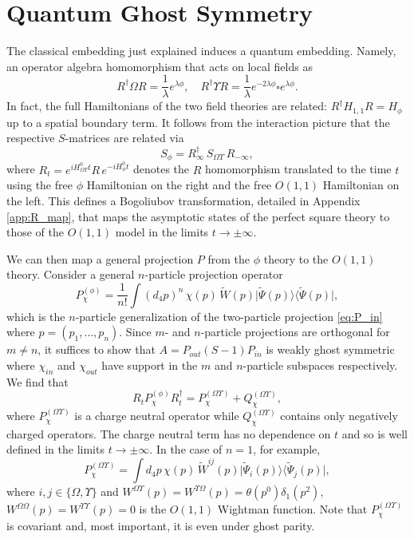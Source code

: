 \documentclass[pra,aps,amsmath,amssymb,notitlepage, twocolumn,superscriptaddress,longbibliography,nofootinbib,floatfix,10pt]{revtex4-2}
\begin{document}
\section{Quantum Ghost Symmetry}

 
The classical embedding just explained induces a quantum embedding. Namely, an operator algebra homomorphism that acts on local fields as
\begin{equation}
    R^\dagger\Omega R = \frac1{\lambda} e^{\lambda\phi}, \quad R^\dagger\Upsilon R = \frac1{\lambda} e^{-2\lambda\phi}\square e^{\lambda\phi}.
\end{equation}
In fact, the full Hamiltonians of the two field theories are related: $R^\dagger H_{1,1} R = H_\phi$ up to a spatial boundary term. It follows from the interaction picture that the respective $S$-matrices are related via
\begin{equation}
\label{eq:isom}
    S_\phi=R_\infty^\dagger\, S_{\Omega\Upsilon} \,R_{-\infty},
\end{equation}
where $R_t=e^{iH^0_{\Omega\Upsilon} t}R\,e^{-iH^0_{\phi} t}$ denotes the $R$ homomorphism translated to the time $t$ using the free $\phi$ Hamiltonian on the right and the free $O(1,1)$ Hamiltonian on the left. This defines a Bogoliubov transformation, detailed in Appendix \ref{app:R_map}, that maps the asymptotic states of the perfect square theory to those of the $O(1,1)$ model in the limits $t\to\pm\infty$.

We can then map a general projection $P$ from the $\phi$ theory to the $O(1,1)$ theory. Consider a general $n$-particle projection operator
\begin{equation}
    P_\chi^{(\phi)} = \frac1{n!} \int (d_4p)^n\,\chi(p)\,\tilde{W}(p) \bigl| \tilde{\Psi}(p)\bigr\rangle \bigl\langle \tilde{\Psi}(p)\bigr|,
\end{equation}
which is the $n$-particle generalization of the two-particle projection \eqref{eq:P_in} where $p=(p_1,\dots,p_n)$. Since $m$- and $n$-particle projections are orthogonal for $m\ne n$, it suffices to show that $A=P_{out}(S\!-\!1)P_{in}$ is weakly ghost symmetric where $\chi_{in}$ and $\chi_{out}$ have support in the $m$ and $n$-particle subspaces respectively. We find that~\cite{BTlong} 
\begin{equation}\label{eq:P_f_decomposition}
	R_tP_\chi^{(\phi)}R_t^\dagger = P_\chi^{(\Omega\Upsilon)} + Q_{\chi}^{(\Omega\Upsilon)},
\end{equation}
where $P_\chi^{(\Omega\Upsilon)}$ is a charge neutral operator while $Q_{\chi}^{(\Omega\Upsilon)}$ contains only negatively charged operators. The charge neutral term has no dependence on $t$ and so is well defined in the limits $t\to\pm\infty$. In the case of $n=1$, for example,
\begin{equation}
    P_\chi^{(\Omega\Upsilon)} = \int d_4p\,\chi(p)\,\tilde{W}^{ij}(p) \bigl| \tilde{\Psi}_{i}(p)\bigr\rangle \bigl\langle \tilde{\Psi}_j(p)\bigr|,
\end{equation}
where $i,j\in\{\Omega,\Upsilon\}$ and $W^{\Omega\Upsilon}(p)=W^{\Upsilon\Omega}(p)=\theta(p^0)\delta_1(p^2)$, $W^{\Omega\Omega}(p)=W^{\Upsilon\Upsilon}(p)=0$ is the $O(1,1)$ Wightman function. Note that $P_\chi^{(\Omega\Upsilon)}$ is covariant and, most important, it is even under ghost parity. 
\end{document}

